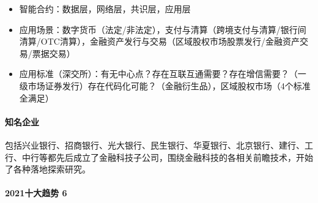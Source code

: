 \documentclass[letterpaper,11pt,english]{sphinxmanual}
\begin{document}
\begin{center}
{{\begin{itemize}
\item {} 
智能合约：数据层，网络层，共识层，应用层

\item {} 
应用场景：数字货币（法定/非法定），支付与清算（跨境支付与清算/银行间清算/OTC清算），金融资产发行与交易（区域股权市场股票发行/金融资产交易/票据交易）

\item {} 
应用标准（深交所）：有无中心点？存在互联互通需要？存在增信需要？（一级市场证券发行）存在代码化可能？（金融衍生品），区域股权市场（4个标准全满足）%
\begin{footnote}[952]\sphinxAtStartFootnote
{}
%
\end{footnote}

\end{itemize}


\paragraph{知名企业}
\label{\detokenize{chapter_AI+Finance/FinTech:id14}}
包括兴业银行、招商银行、光大银行、民生银行、华夏银行、北京银行、建行、工行、中行等都先后成立了金融科技子公司，围绕金融科技的各相关前瞻技术，开始了各种落地探索研究。%
\begin{footnote}[953]\sphinxAtStartFootnote
{}
%
\end{footnote}

%
\begin{footnote}[954]\sphinxAtStartFootnote
{}
%
\end{footnote}


\paragraph{2021十大趋势 6\sphinxfootnotemark[955]}
\label{\detokenize{chapter_AI+Finance/FinTech:id15}}%
\begin{footnotetext}[955]\sphinxAtStartFootnote
{}
%
\end{footnotetext}\ignorespaces 
\begin{figure}[H]
\centering
\capstart


\end{figure}}}
\end{center}
\end{document}
